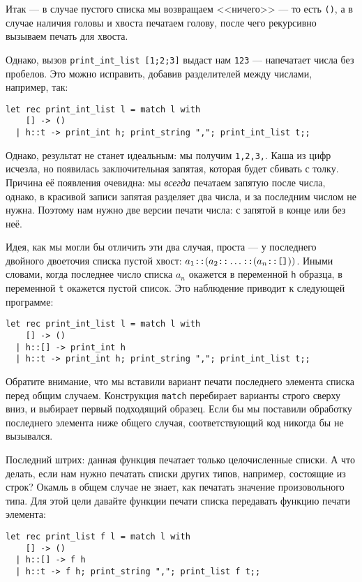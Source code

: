 Итак --- в случае пустого списка мы возвращаем <<ничего>> --- то есть \verb!()!, а в случае
наличия головы и хвоста печатаем голову, после чего рекурсивно вызываем печать
для хвоста.

Однако, вызов \verb!print_int_list [1;2;3]! выдаст нам \verb!123! --- напечатает
числа без пробелов. Это можно исправить, добавив разделителей между числами, например, так:

\begin{verbatim}
let rec print_int_list l = match l with
    [] -> ()
  | h::t -> print_int h; print_string ","; print_int_list t;;
\end{verbatim}

Однако, результат не станет идеальным: мы получим \verb!1,2,3,!. Каша из цифр
исчезла, но появилась заключительная запятая, которая будет сбивать с толку.
Причина её появления очевидна: мы \emph{всегда} печатаем запятую после числа,
однако, в красивой записи запятая разделяет два числа, и за последним числом 
не нужна. Поэтому нам нужно две версии печати числа: с запятой в конце или без неё.

Идея, как мы могли бы отличить эти два случая, проста --- у последнего двойного двоеточия
списка пустой хвост: $a_1 \verb!::! (a_2 \verb!::! \dots \verb!::! (a_n \verb!::! \verb![]!))$.
Иными словами, когда последнее число списка $a_n$ окажется в переменной \verb!h! образца,
в переменной \verb!t! окажется пустой список. Это наблюдение приводит к следующей 
программе:

\begin{verbatim}
let rec print_int_list l = match l with
    [] -> ()
  | h::[] -> print_int h
  | h::t -> print_int h; print_string ","; print_int_list t;;
\end{verbatim}

Обратите внимание, что мы вставили вариант печати последнего элемента списка перед 
общим случаем. Конструкция \verb!match! перебирает варианты строго сверху вниз,
и выбирает первый подходящий образец. Если бы мы поставили обработку последнего
элемента ниже общего случая, соответствующий код никогда бы не вызывался.

Последний штрих: данная функция печатает только целочисленные списки.
А что делать, если нам нужно печатать списки других типов, например, состоящие из строк?
Окамль в общем случае не знает, как печатать значение произовольного типа. Для этой цели
давайте функции печати списка передавать функцию печати элемента:

\begin{verbatim}
let rec print_list f l = match l with
    [] -> ()
  | h::[] -> f h
  | h::t -> f h; print_string ","; print_list f t;;
\end{verbatim}

